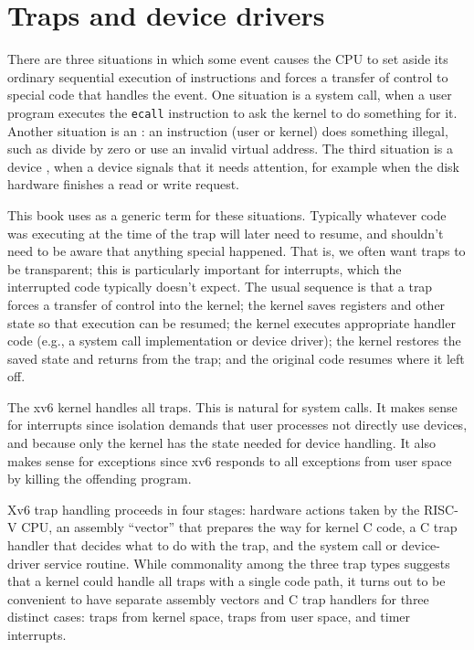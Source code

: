 \chapter{Traps and device drivers}
\label{CH:TRAP}

There are three situations in which some event causes the CPU to set
aside its ordinary sequential execution of instructions and forces a
transfer of control to special code that handles the event. One
situation is a system call, when a user program 
executes the {\tt ecall} instruction to ask the kernel to do 
something for it. Another situation is an :
an instruction (user or kernel) does something illegal, such as divide
by zero or use an invalid virtual address. The third situation is a
device , when a device signals that it needs
attention, for example when the disk hardware finishes a read or write
request.

This book uses  as a generic term for these
situations. Typically whatever code was executing at the time of the
trap will later need to resume, and shouldn't need to be aware that
anything special happened. That is, we often want traps to be
transparent; this is particularly important for interrupts, which the
interrupted code typically doesn't expect. The usual sequence is that
a trap forces a transfer of control into the kernel; the kernel saves
registers and other state so that execution can be resumed; the kernel
executes appropriate handler code (e.g., a system call implementation
or device driver); the kernel restores the saved state and returns
from the trap; and the original code resumes where it left off.

The xv6 kernel handles all traps. This is natural for system calls. It
makes sense for interrupts since isolation demands that user processes
not directly use devices, and because only the kernel has the state
needed for device handling. It also makes sense for exceptions since
xv6 responds to all exceptions from user space by killing the
offending program.

Xv6 trap handling proceeds in four stages: hardware actions taken by
the RISC-V CPU, an assembly ``vector'' that prepares the way for
kernel C code, a C trap handler that decides what to do with the trap,
and the system call or device-driver service routine. While
commonality among the three trap types suggests that a kernel could
handle all traps with a single code path, it turns out to be
convenient to have separate assembly vectors and C trap handlers for
three distinct cases: traps from kernel space, traps from user space,
and timer interrupts.

